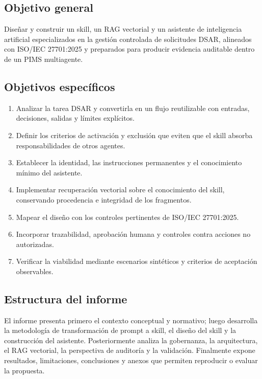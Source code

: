 \documentclass[11pt,a4paper]{article}
\begin{document}
\subsection{Objetivo general}

Diseñar y construir un skill, un RAG vectorial y un asistente de inteligencia artificial especializados en la gestión controlada de solicitudes DSAR, alineados con ISO/IEC 27701:2025 y preparados para producir evidencia auditable dentro de un PIMS multiagente.

\subsection{Objetivos específicos}

\begin{enumerate}[label=\arabic*.]
  \item Analizar la tarea DSAR y convertirla en un flujo reutilizable con entradas, decisiones, salidas y límites explícitos.
  \item Definir los criterios de activación y exclusión que eviten que el skill absorba responsabilidades de otros agentes.
  \item Establecer la identidad, las instrucciones permanentes y el conocimiento mínimo del asistente.
  \item Implementar recuperación vectorial sobre el conocimiento del skill, conservando procedencia e integridad de los fragmentos.
  \item Mapear el diseño con los controles pertinentes de ISO/IEC 27701:2025.
  \item Incorporar trazabilidad, aprobación humana y controles contra acciones no autorizadas.
  \item Verificar la viabilidad mediante escenarios sintéticos y criterios de aceptación observables.
\end{enumerate}

\subsection{Estructura del informe}

El informe presenta primero el contexto conceptual y normativo; luego desarrolla la metodología de transformación de prompt a skill, el diseño del skill y la construcción del asistente. Posteriormente analiza la gobernanza, la arquitectura, el RAG vectorial, la perspectiva de auditoría y la validación. Finalmente expone resultados, limitaciones, conclusiones y anexos que permiten reproducir o evaluar la propuesta.
\end{document}
